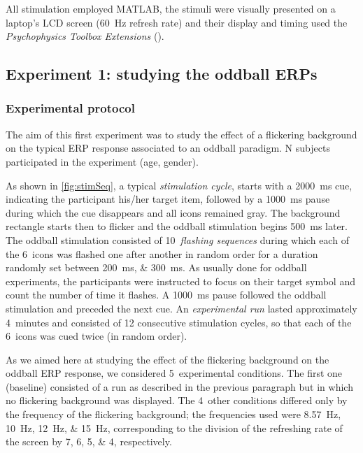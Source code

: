 \documentclass[10pt]{article}
\begin{document}
    All stimulation employed MATLAB\textsuperscript{\textregistered}, the stimuli were visually presented on a laptop's LCD screen (\SI{60}{\Hz} refresh rate) and their display and timing used the \emph{Psychophysics Toolbox Extensions} (\cite{Brainard1997,Pelli1997}).



    \subsection{Experiment 1: studying the oddball \acsp{ERP}}
    \label{sec:2.2Oddball}

        \subsubsection{Experimental protocol}
        \label{sec:2.2.1Protocol}

        The aim of this first experiment was to study the effect of a flickering background on the typical \ac{ERP} response associated to an oddball paradigm.
        N subjects participated in the experiment (age, gender).

        As shown in \autoref{fig:stimSeq}, a typical \emph{stimulation cycle}, starts with a \SI{2000}{\ms} cue, indicating the participant his/her target item, followed by a \SI{1000}{\ms} pause during which the cue disappears and all icons remained gray.
        The background rectangle starts then to flicker and the oddball stimulation begins \SI{500}{\ms} later.
        The oddball stimulation consisted of 10~\emph{flashing sequences} during which each of the 6~icons was flashed one after another in random order for a duration randomly set between \SIlist[list-units = single]{200;300}{\ms}.
        As usually done for oddball experiments, the participants were instructed to focus on their target symbol and count the number of time it flashes.
        A \SI{1000}{\ms} pause followed the oddball stimulation and preceded the next cue.
        An \emph{experimental run} lasted approximately 4~minutes and consisted of 12 consecutive stimulation cycles, so that each of the 6~icons was cued twice (in random order).

        As we aimed here at studying the effect of the flickering background on the oddball \ac{ERP} response, we considered 5~experimental conditions.
        The first one (baseline) consisted of a run as described in the previous paragraph but in which no flickering background was displayed.
        The 4~other conditions differed only by the frequency of the flickering background; the frequencies used were \SIlist[list-units = single]{8.57;10;12;15}{\Hz}, corresponding to the division of the refreshing rate of the screen by \numlist{7;6;5;4}, respectively.
\end{document}
